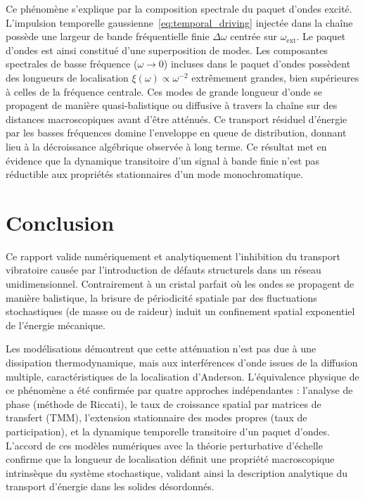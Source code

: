\documentclass[11pt, a4paper, twoside]{article}
\begin{document}
Ce phénomène s'explique par la composition spectrale du paquet d'ondes excité. L'impulsion temporelle gaussienne~\eqref{eq:temporal_driving} injectée dans la chaîne possède une largeur de bande fréquentielle finie $\Delta\omega$ centrée sur $\omega_{\text{ext}}$. Le paquet d'ondes est ainsi constitué d'une superposition de modes. Les composantes spectrales de basse fréquence ($\omega \to 0$) incluses dans le paquet d'ondes possèdent des longueurs de localisation $\xi(\omega) \propto \omega^{-2}$ extrêmement grandes, bien supérieures à celles de la fréquence centrale. Ces modes de grande longueur d'onde se propagent de manière quasi-balistique ou diffusive à travers la chaîne sur des distances macroscopiques avant d'être atténués. Ce transport résiduel d'énergie par les basses fréquences domine l'enveloppe en queue de distribution, donnant lieu à la décroissance algébrique observée à long terme. Ce résultat met en évidence que la dynamique transitoire d'un signal à bande finie n'est pas réductible aux propriétés stationnaires d'un mode monochromatique.



\section{Conclusion}

Ce rapport valide numériquement et analytiquement l'inhibition du transport vibratoire causée par l'introduction de défauts structurels dans un réseau unidimensionnel. Contrairement à un cristal parfait où les ondes se propagent de manière balistique, la brisure de périodicité spatiale par des fluctuations stochastiques (de masse ou de raideur) induit un confinement spatial exponentiel de l'énergie mécanique.

Les modélisations démontrent que cette atténuation n'est pas due à une dissipation thermodynamique, mais aux interférences d'onde issues de la diffusion multiple, caractéristiques de la localisation d'Anderson. L'équivalence physique de ce phénomène a été confirmée par quatre approches indépendantes : l'analyse de phase (méthode de Riccati), le taux de croissance spatial par matrices de transfert (TMM), l'extension stationnaire des modes propres (taux de participation), et la dynamique temporelle transitoire d'un paquet d'ondes. L'accord de ces modèles numériques avec la théorie perturbative d'échelle confirme que la longueur de localisation définit une propriété macroscopique intrinsèque du système stochastique, validant ainsi la description analytique du transport d'énergie dans les solides désordonnés.
\end{document}
